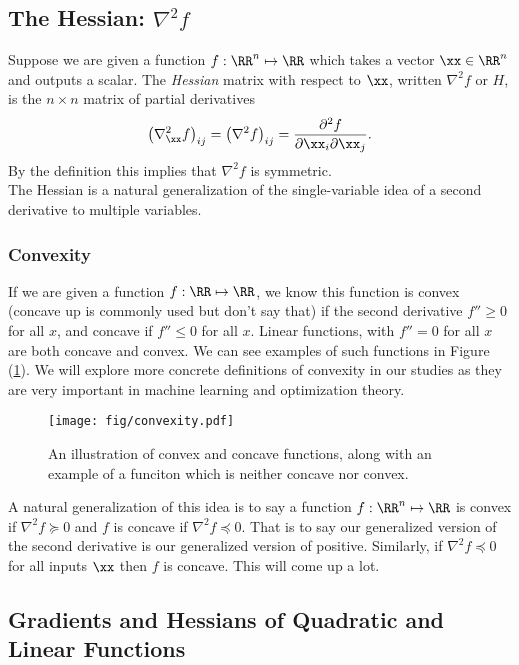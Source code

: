 \documentclass{article}
\begin{document}
\subsection{The Hessian: $\nabla^2f$}

Suppose we are given a function $f : \RR^n \mapsto \RR$ which takes a vector $\xx\in\RR^n$
and outputs a scalar. The \textit{Hessian} matrix with respect to $\xx$, written $\nabla^2 f$
or $H$, is the $n\times n$ matrix of partial derivatives
\[
    \left(\nabla_\xx^2 f\right)_{ij} = \left( \nabla^2f \right)_{ij} = \frac{\partial^2 f}{\partial \xx_i \partial \xx_j}.
\]
By the definition this implies that $\nabla^2 f$ is symmetric.\\

The Hessian is a natural generalization of the single-variable idea of a second derivative to
multiple variables.

\subsubsection{Convexity}

If we are given a function $f : \RR \mapsto \RR$, we know this function is convex (concave up is
commonly used but don't say that) if the second derivative $f'' \geq 0$ for all $x$, and concave if
$f'' \leq 0$ for all $x$. Linear functions, with $f''=0$ for all $x$ are both concave and convex.
We can see examples of such functions in Figure (\ref{fig:convex}). We will explore more concrete
definitions of convexity in our studies as they are very important in machine learning and
optimization theory.\\

\begin{figure}[htpb]
    \centering
    \texttt{[image: fig/convexity.pdf]}
    \caption{An illustration of convex and concave functions, along with
    an example of a funciton which is neither concave nor convex.}
    \label{fig:convex}
\end{figure}

A natural generalization of this idea is to say a function $f : \RR^n \mapsto \RR$ is
convex if $\nabla^2 f \succeq 0$ and $f$ is concave if $\nabla^2 f \preceq 0$. That is
to say our generalized version of the second derivative is our generalized version of
positive. Similarly, if $\nabla^2 f \preceq 0$ for all inputs $\xx$ then $f$ is concave.
This will come up a lot.

\subsection{Gradients and Hessians of Quadratic and Linear Functions}
\end{document}
